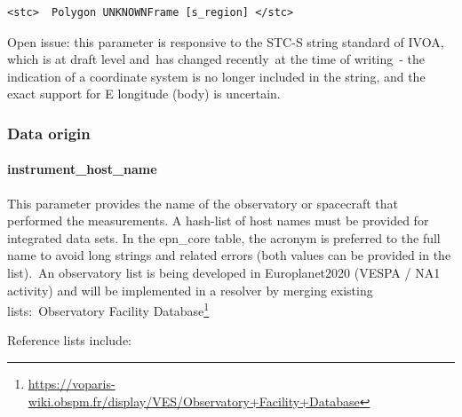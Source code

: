 \documentclass[11pt,a4paper]{ivoa}
\begin{document}
\begin{verbatim}
<stc>  Polygon UNKNOWNFrame [s_region] </stc>
\end{verbatim}




Open issue: this parameter is responsive to the STC-S string standard of IVOA, which is at draft level and has changed recently at the time of writing - the indication of a coordinate system is no longer included in the string, and the exact support for E longitude (body) is uncertain.

\subsubsection{Data origin}

\paragraph{instrument\_host\_name}

This parameter provides the name of the observatory or spacecraft that performed the measurements. A hash-list of host names must be provided for integrated data sets. In the epn\_core table, the acronym is preferred to the full name to avoid long strings and related errors (both values can be provided in the list). An observatory list is being developed in Europlanet2020 (VESPA / NA1 activity) and will be implemented in a resolver by merging existing lists: Observatory Facility Database\footnote{\url{https://voparis-wiki.obspm.fr/display/VES/Observatory+Facility+Database}}

Reference lists include:
\end{document}
